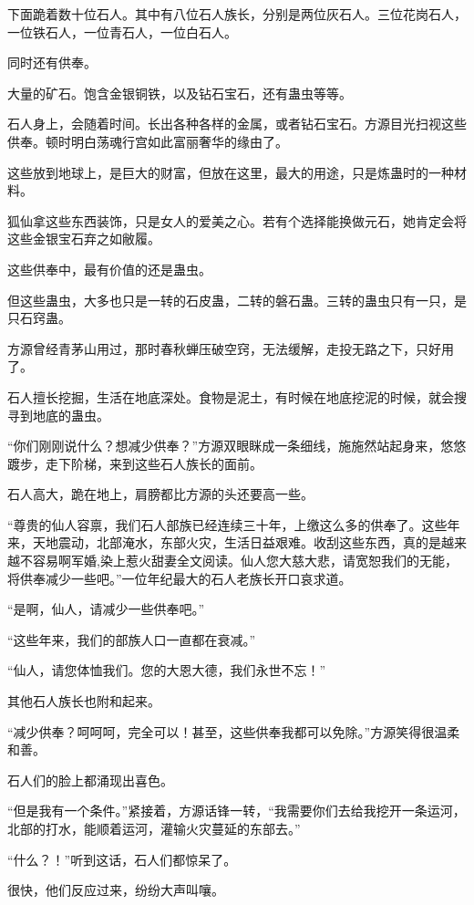 \begin{this_body}
下面跪着数十位石人。其中有八位石人族长，分别是两位灰石人。三位花岗石人，一位铁石人，一位青石人，一位白石人。

同时还有供奉。

大量的矿石。饱含金银铜铁，以及钻石宝石，还有蛊虫等等。

石人身上，会随着时间。长出各种各样的金属，或者钻石宝石。方源目光扫视这些供奉。顿时明白荡魂行宫如此富丽奢华的缘由了。

这些放到地球上，是巨大的财富，但放在这里，最大的用途，只是炼蛊时的一种材料。

狐仙拿这些东西装饰，只是女人的爱美之心。若有个选择能换做元石，她肯定会将这些金银宝石弃之如敝履。

这些供奉中，最有价值的还是蛊虫。

但这些蛊虫，大多也只是一转的石皮蛊，二转的磐石蛊。三转的蛊虫只有一只，是只石窍蛊。

方源曾经青茅山用过，那时春秋蝉压破空窍，无法缓解，走投无路之下，只好用了。

石人擅长挖掘，生活在地底深处。食物是泥土，有时候在地底挖泥的时候，就会搜寻到地底的蛊虫。

“你们刚刚说什么？想减少供奉？”方源双眼眯成一条细线，施施然站起身来，悠悠踱步，走下阶梯，来到这些石人族长的面前。

石人高大，跪在地上，肩膀都比方源的头还要高一些。

“尊贵的仙人容禀，我们石人部族已经连续三十年，上缴这么多的供奉了。这些年来，天地震动，北部淹水，东部火灾，生活日益艰难。收刮这些东西，真的是越来越不容易啊军婚,染上惹火甜妻全文阅读。仙人您大慈大悲，请宽恕我们的无能，将供奉减少一些吧。”一位年纪最大的石人老族长开口哀求道。

“是啊，仙人，请减少一些供奉吧。”

“这些年来，我们的部族人口一直都在衰减。”

“仙人，请您体恤我们。您的大恩大德，我们永世不忘！”

其他石人族长也附和起来。

“减少供奉？呵呵呵，完全可以！甚至，这些供奉我都可以免除。”方源笑得很温柔和善。

石人们的脸上都涌现出喜色。

“但是我有一个条件。”紧接着，方源话锋一转，“我需要你们去给我挖开一条运河，北部的打水，能顺着运河，灌输火灾蔓延的东部去。”

“什么？！”听到这话，石人们都惊呆了。

很快，他们反应过来，纷纷大声叫嚷。


\end{this_body}

